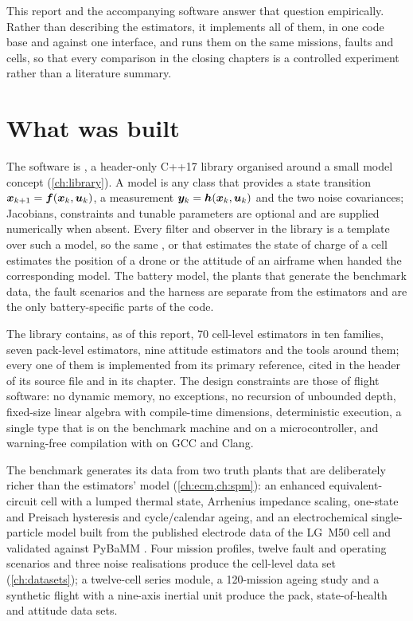 This report and the accompanying software answer that question empirically. Rather than
describing the estimators, it implements all of them, in one code base and against one
interface, and runs them on the same missions, faults and cells, so that every comparison
in the closing chapters is a controlled experiment rather than a literature summary.

\section{What was built}

The software is \estkit, a header-only C++17 library organised around a small model
concept (\cref{ch:library}). A model is any class that provides a state transition
$\bm{x}_{k+1}=\bm f(\bm{x}_k,\bm{u}_k)$, a measurement $\bm{y}_k=\bm h(\bm{x}_k,\bm{u}_k)$ and the two noise
covariances; Jacobians, constraints and tunable parameters are optional and are supplied
numerically when absent. Every filter and observer in the library is a template over such a
model, so the same ,  or  that estimates the state
of charge of a cell estimates the position of a drone or the attitude of an airframe when
handed the corresponding model. The battery model, the plants that generate the benchmark
data, the fault scenarios and the harness are separate from the estimators and are the
only battery-specific parts of the code.

The library contains, as of this report, 70 cell-level estimators in ten families, seven
pack-level estimators, nine attitude estimators and the tools around them; every one of
them is implemented from its primary reference, cited in the header of its source file and
in its chapter. The design constraints are those of flight software: no dynamic memory, no
exceptions, no recursion of unbounded depth, fixed-size linear algebra with compile-time
dimensions, deterministic execution, a single  type that is  on the
benchmark machine and  on a microcontroller, and warning-free compilation with
 on GCC and Clang.

The benchmark generates its data from two truth plants that are deliberately richer than
the estimators' model (\cref{ch:ecm,ch:spm}): an enhanced equivalent-circuit cell with a
lumped thermal state, Arrhenius impedance scaling, one-state and Preisach hysteresis and
cycle/calendar ageing, and an electrochemical single-particle model built from the
published electrode data of the LG~M50 cell \citep{chen2020parameterization} and validated
against PyBaMM \citep{sulzer2021pybamm}. Four mission profiles, twelve fault and operating
scenarios and three noise realisations produce the cell-level data set (\cref{ch:datasets});
a twelve-cell series module, a 120-mission ageing study and a synthetic flight with a
nine-axis inertial unit produce the pack, state-of-health and attitude data sets.

